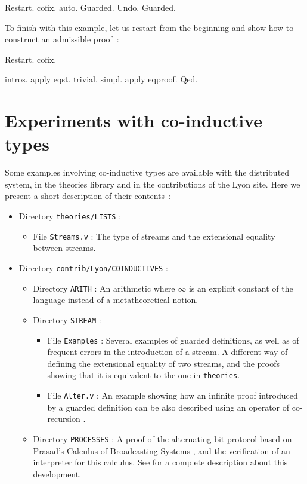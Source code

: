 \begin{coq_example}
Restart.
cofix.
auto.
Guarded.
Undo.
Guarded.
\end{coq_example}

\noindent To finish with this example, let us restart from the
beginning and show how to construct an admissible proof~:

\begin{coq_example} 
Restart.
 cofix.
\end{coq_example}


\begin{coq_example}
intros.
apply eqst.
trivial.
simpl.
apply eqproof.
Qed.
\end{coq_example}


\section{Experiments with co-inductive types}

Some examples involving co-inductive types are available with
the distributed system, in the theories library and in the contributions
of the Lyon site. Here we present a short description of their contents~:
\begin{itemize}
\item Directory \verb!theories/LISTS! : 
        \begin{itemize}
                \item File \verb!Streams.v! : The type of streams and the 
extensional equality between streams. 
        \end{itemize}

\item Directory \verb!contrib/Lyon/COINDUCTIVES! : 
      \begin{itemize}
                \item Directory \verb!ARITH! : An arithmetic where $\infty$
is an explicit constant of the language instead of a metatheoretical notion.
                \item Directory \verb!STREAM! :
      \begin{itemize}
                \item File \verb!Examples! :
Several examples of guarded definitions, as well as 
of frequent errors in the introduction of a stream. A different 
way of defining the extensional equality of two streams,
and the proofs showing that it is equivalent to the one in \verb!theories!.
                \item File \verb!Alter.v! : An example showing how 
an infinite proof introduced by a guarded definition can be also described
using an operator of co-recursion \cite{Gimenez95b}.
                 \end{itemize}
\item Directory \verb!PROCESSES! : A proof of the alternating 
bit protocol based on Pra\-sad's Calculus of Broadcasting Systems \cite{Prasad93},
and the verification of an interpreter for this calculus. 
See \cite{Gimenez95b} for a complete description about this development.
        \end{itemize}
\end{itemize}

%

